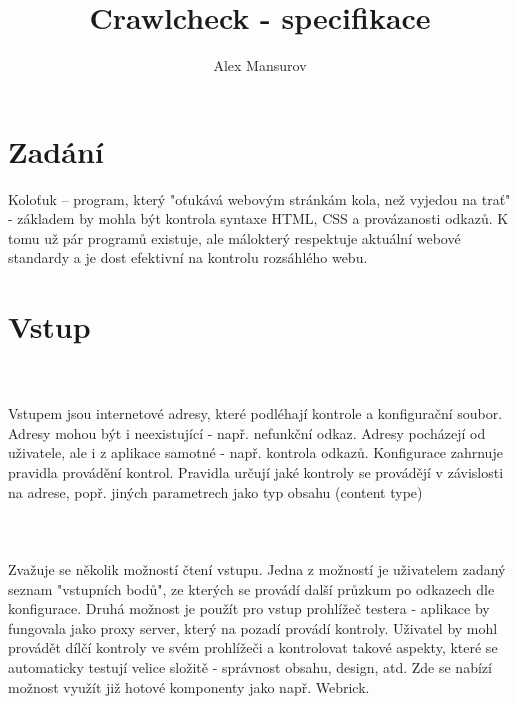 \documentclass[10pt]{article}
\begin{document}
\title{Crawlcheck - specifikace}
\author{Alex Mansurov}
\maketitle
\newpage

\section{Zad\'an\'i}
Kolo\v{t}uk – program, kter\'y "o\v{t}uk\'av\'a webov\'ym str\'ank\'am kola, ne\v{z} vyjedou na tra\v{t}" - z\'akladem by mohla b\'yt kontrola syntaxe HTML, CSS a prov\'azanosti odkaz\r{u}. K tomu u\v{z} p\'ar program\r{u} existuje, ale m\'alokterý respektuje aktu\'aln\'i webov\'e standardy a je dost efektivn\'i na kontrolu rozs\'ahl\'eho webu. 

\section{Vstup}
\paragraph{~}Vstupem jsou internetov\'e adresy, kter\'e podl\'ehaj\'i kontrole a konfigura\v{c}n\'i soubor. Adresy mohou b\'yt i neexistuj\'ic\'i - nap\v{r}. nefunk\v{c}n\'i odkaz. Adresy poch\'azej\'i od u\v{z}ivatele, ale i z aplikace samotn\'e - nap\v{r}. kontrola odkaz\r{u}. Konfigurace zahrnuje pravidla prov\'ad\v{e}n\'i kontrol. Pravidla ur\v{c}uj\'i jak\'e kontroly se prov\'ad\v{e}j\'i v z\'avislosti na adrese, pop\v{r}. jin\'ych parametrech jako typ obsahu (content type)

\paragraph{~}Zva\v{z}uje se n\v{e}kolik mo\v{z}nost\'i \v{c}ten\'i vstupu. Jedna z mo\v{z}nost\'i je u\v{z}ivatelem zadan\'y seznam "vstupn\'ich bod\r{u}", ze kter\'ych se prov\'ad\'i dal\v{s}\'i pr\r{u}zkum po odkazech dle konfigurace. Druh\'a mo\v{z}nost je pou\v{z}\'it pro vstup prohl\'i\v{z}e\v{c} testera - aplikace by fungovala jako proxy server, kter\'y na pozad\'i prov\'ad\'i kontroly. U\v{z}ivatel by mohl prov\'ad\v{e}t d\'il\v{c}\'i kontroly ve sv\'em prohl\'i\v{z}e\v{c}i a kontrolovat takov\'e aspekty, kter\'e se automaticky testuj\'i velice slo\v{z}it\v{e} - spr\'avnost obsahu, design, atd. Zde se nab\'iz\'i mo\v{z}nost vyu\v{z}\'it ji\v{z} hotov\'e komponenty jako nap\v{r}. Webrick.
\end{document}
